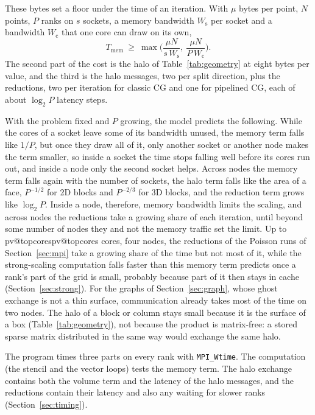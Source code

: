 \documentclass[10pt,a4paper]{article}
\makeatletter
\newcommand{\code}[1]{\texttt{#1}}
\newcommand{\val}[1]{\ifcsname pv@#1\endcsname\csname pv@#1\endcsname\else\errmessage{undefined generated value #1}\fi}
\makeatother
\begin{document}
These bytes set a floor under the time of an iteration. With $\mu$ bytes per point, $N$ points, $P$ ranks on $s$
sockets, a memory bandwidth $W_{\text{s}}$ per socket and a bandwidth $W_{\text{c}}$ that one core can draw on its own,
\begin{equation*}
T_{\text{mem}}\ \ge\ \max\Big(\frac{\mu N}{s\,W_{\text{s}}},\ \frac{\mu N}{P\,W_{\text{c}}}\Big).
\end{equation*}
The second part of the cost is the halo of Table~\ref{tab:geometry} at eight bytes per value, and the third is the halo
messages, two per split direction, plus the reductions, two per iteration for classic CG and one for pipelined CG, each
of about $\log_2 P$ latency steps.

With the problem fixed and $P$ growing, the model predicts the following. While the cores of a socket leave some of its
bandwidth unused, the memory term falls like $1/P$, but once they draw all of it, only another socket or another node
makes the term smaller, so inside a socket the time stops falling well before its cores run out, and inside a node only
the second socket helps. Across nodes the memory
term falls again with the number of sockets, the halo term falls like the area of a face, $P^{-1/2}$ for 2D blocks and
$P^{-2/3}$ for 3D blocks, and the reduction term grows like $\log_2 P$. Inside a node, therefore, memory bandwidth
limits the scaling, and across nodes the reductions take a growing share of each iteration, until beyond some number of
nodes they and not the memory traffic set the limit. Up to \val{topcores} cores, four nodes, the reductions of the
Poisson runs of Section~\ref{sec:mpi} take a growing share of the time but not most of it, while the strong-scaling
computation falls faster than this memory term predicts once a rank's part of the grid is small, probably because part
of it then stays in cache (Section~\ref{sec:strong}). For the graphs of Section~\ref{sec:graph}, whose ghost exchange
is not a thin surface, communication already takes most of the time on two nodes. The halo of a block or column stays
small because it is the surface of a box (Table~\ref{tab:geometry}), not because the product is matrix-free: a stored
sparse matrix distributed in the same way would exchange the same halo.

The program times three parts on every rank with \code{MPI\_Wtime}. The computation (the stencil and the vector loops)
tests the memory term. The halo exchange contains both the volume term and the latency of the halo messages, and the
reductions contain their latency and also any waiting for slower ranks (Section~\ref{sec:timing}).
\end{document}
